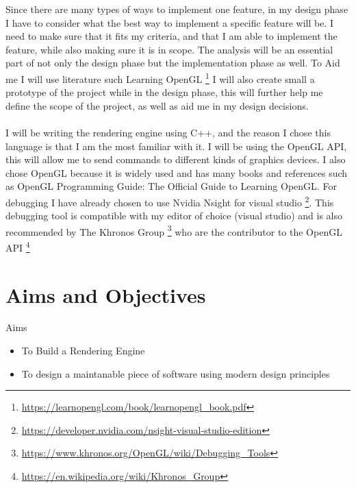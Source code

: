 \documentclass[]{article}
\begin{document}
Since there are many types of ways to implement one feature, in my design phase I have to consider what the best way to implement a specific feature will be. I need to make sure that it fits my criteria, and that I am able to implement the feature, while also making sure it is in scope. The analysis will be an essential part of not only the design phase but the implementation phase as well.
To Aid me I will use literature such Learning OpenGL \footnote{\url{https://learnopengl.com/book/learnopengl_book.pdf}}
I will also create small a prototype of the project while in the design phase, this will further help me define the scope of the project, as well as aid me in my design decisions.
\\\\
I will be writing the rendering engine using C++, and the reason I chose this language is that I am the most familiar with it. I will be using the OpenGL API, this will allow me to send commands to different kinds of graphics devices\cite{designengine}. I also chose OpenGL because it is widely used and has many books and references such as OpenGL Programming Guide: The Official Guide to Learning OpenGL\cite{opengl30}. 
For debugging I have already chosen to use Nvidia Nsight for visual studio \footnote{\url{https://developer.nvidia.com/nsight-visual-studio-edition}}. This debugging tool is compatible with my editor of choice (visual studio) and is also recommended by The Khronos Group \footnote{\url{https://www.khronos.org/OpenGL/wiki/Debugging_Tools}} who are the contributor to the OpenGL API \footnote{\url{https://en.wikipedia.org/wiki/Khronos_Group}}

\section{Aims and Objectives}
Aims
\begin{itemize}
  \item To Build a Rendering Engine
  \item To design a maintanable piece of software using modern design principles
\end{itemize}
\end{document}
